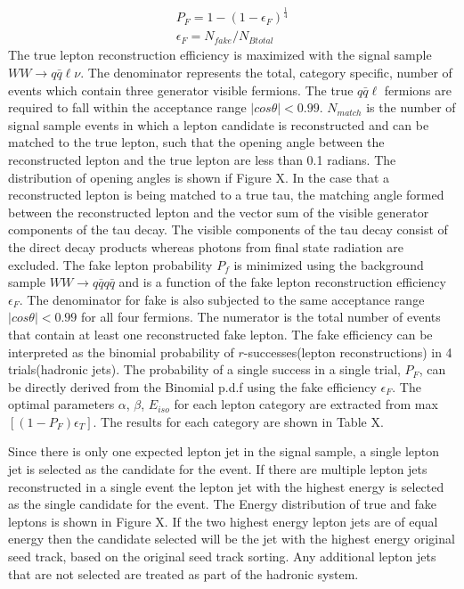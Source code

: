 \begin{equation}
\begin{split}
\label{eq:pf}
P_F = 1-(1-\epsilon_F)^{\frac{1}{4}} \\
\epsilon_F = N_{fake}/N_{Btotal}
\end{split}
\end{equation}
The true lepton reconstruction efficiency is maximized with the signal sample $WW\rightarrow q\bar{q}\ell\nu$. The denominator represents the total, category specific, number of events which contain three generator visible fermions. The true $q\bar{q}\ell$ fermions are required to fall within the acceptance range $|cos\theta| < 0.99$. $N_{match}$ is the number of signal sample events in which a lepton candidate is reconstructed and can be matched to the true lepton, such that the opening angle between the reconstructed lepton and the true lepton are less than 0.1 radians. The distribution of opening angles is shown if Figure X. In the case that a reconstructed lepton is being matched to a true tau, the matching angle formed between the reconstructed lepton and the vector sum of the visible generator components of the tau decay. The visible components of the tau decay consist of the direct decay products whereas photons from final state radiation are excluded. The fake lepton probability $P_f$ is minimized using the background sample $WW\rightarrow q\bar{q}q\bar{q}$ and is a function of the fake lepton reconstruction efficiency $\epsilon_F$. The denominator for fake is also subjected to the same acceptance range $|cos\theta| < 0.99$ for all four fermions. The numerator is the total number of events  that contain at least one reconstructed fake lepton. The fake efficiency can be interpreted as the binomial probability of $r$-successes(lepton reconstructions) in 4 trials(hadronic jets). The probability of a single success in a single trial, $P_F$, can be directly derived from the Binomial p.d.f using the fake efficiency $\epsilon_F$. The optimal parameters $\alpha$, $\beta$, $E_{iso}$ for each lepton category are extracted from max$[(1-P_F)\epsilon_T]$. The results for each category are shown in Table X. 

Since there is only one expected lepton jet in the signal sample, a single lepton jet is selected as the candidate for the event. If there are multiple lepton jets reconstructed in a single event the lepton jet with the highest energy is selected as the single candidate for the event. The Energy distribution of true and fake leptons is shown in Figure X. If the two highest energy lepton jets are of equal energy then the candidate selected will be the jet with the highest energy original seed track, based on the original seed track sorting.  Any additional lepton jets that are not selected are treated as part of the hadronic system.


